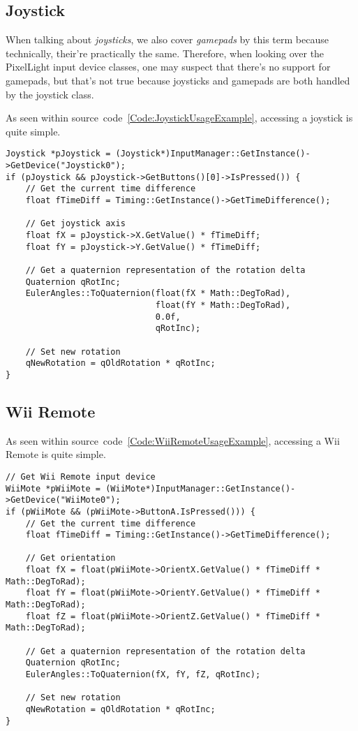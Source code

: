 \subsection{Joystick}
When talking about \emph{joysticks}, we also cover \emph{gamepads} by this term because technically, their're practically the same. Therefore, when looking over the PixelLight input device classes, one may suspect that there's no support for gamepads, but that's not true because joysticks and gamepads are both handled by the joystick class.

As seen within source~code~\ref{Code:JoystickUsageExample}, accessing a joystick is quite simple.
\begin{lstlisting}[float=htb,label=Code:JoystickUsageExample,caption={Joystick usage example}]
Joystick *pJoystick = (Joystick*)InputManager::GetInstance()->GetDevice("Joystick0");
if (pJoystick && pJoystick->GetButtons()[0]->IsPressed()) {
	// Get the current time difference
	float fTimeDiff = Timing::GetInstance()->GetTimeDifference();

	// Get joystick axis
	float fX = pJoystick->X.GetValue() * fTimeDiff;
	float fY = pJoystick->Y.GetValue() * fTimeDiff;

	// Get a quaternion representation of the rotation delta
	Quaternion qRotInc;
	EulerAngles::ToQuaternion(float(fX * Math::DegToRad),
							  float(fY * Math::DegToRad),
							  0.0f,
							  qRotInc);

	// Set new rotation
	qNewRotation = qOldRotation * qRotInc;
}
\end{lstlisting}




\subsection{Wii Remote}
As seen within source~code~\ref{Code:WiiRemoteUsageExample}, accessing a Wii Remote is quite simple.
\begin{lstlisting}[float=htb,label=Code:WiiRemoteUsageExample,caption={Wii Remote usage example}]
// Get Wii Remote input device
WiiMote *pWiiMote = (WiiMote*)InputManager::GetInstance()->GetDevice("WiiMote0");
if (pWiiMote && (pWiiMote->ButtonA.IsPressed())) {
	// Get the current time difference
	float fTimeDiff = Timing::GetInstance()->GetTimeDifference();

	// Get orientation
	float fX = float(pWiiMote->OrientX.GetValue() * fTimeDiff * Math::DegToRad);
	float fY = float(pWiiMote->OrientY.GetValue() * fTimeDiff * Math::DegToRad);
	float fZ = float(pWiiMote->OrientZ.GetValue() * fTimeDiff * Math::DegToRad);

	// Get a quaternion representation of the rotation delta
	Quaternion qRotInc;
	EulerAngles::ToQuaternion(fX, fY, fZ, qRotInc);

	// Set new rotation
	qNewRotation = qOldRotation * qRotInc;
}
\end{lstlisting}




